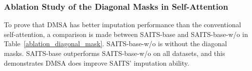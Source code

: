 \documentclass{article}
\begin{document}
\subsubsection{Ablation Study of the Diagonal Masks in Self-Attention} \label{diagonal_mask_ablation_study}
\begin{table} [!htb]
	\caption{Ablation experiment results of the diagonal masks in self-attention. SAITS-base-w/o is the exact same as SAITS-base, except it is without the diagonal masks in self-attention layers.}
	\label{ablation_diagonal_mask}
	\centering
	\begin{minipage}{1\textwidth}
\end{minipage}
\end{table}
To prove that DMSA has better imputation performance than the conventional self-attention, a comparison is made between SAITS-base and SAITS-base-w/o in Table~\ref{ablation_diagonal_mask}. SAITS-base-w/o is without the diagonal masks. SAITS-base outperforms SAITS-base-w/o on all datasets, and this demonstrates DMSA does improve SAITS' imputation ability.
\end{document}
